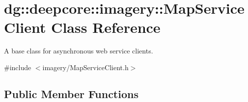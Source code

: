 \hypertarget{classdg_1_1deepcore_1_1imagery_1_1_map_service_client}{}\section{dg\+:\+:deepcore\+:\+:imagery\+:\+:Map\+Service\+Client Class Reference}
\label{classdg_1_1deepcore_1_1imagery_1_1_map_service_client}


A base class for asynchronous web service clients.  




{\ttfamily \#include $<$imagery/\+Map\+Service\+Client.\+h$>$}

\subsection*{Public Member Functions}
